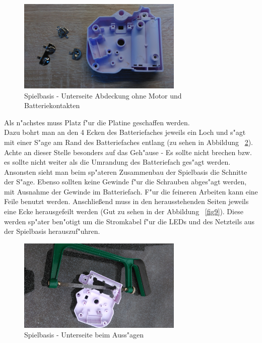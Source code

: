 \vspace{1cm}
\begin{figure}[!ht]
	\centering
  	\includegraphics[width=0.7\textwidth]{pictures/loolou_007.jpg}
	\caption{Spielbasis - Unterseite Abdeckung ohne Motor und Batteriekontakten}
	\label{fig7}
\end{figure}
\vspace{0.5cm}

Als n"achstes muss Platz f"ur die Platine geschaffen werden. \\ 
Dazu bohrt man an den 4 Ecken des Batteriefaches jeweils ein Loch und s"agt mit einer S"age am Rand des Batteriefaches entlang (zu sehen in Abbildung ~\ref{fig8}). \\
Achte an dieser Stelle besonders auf das Geh"ause - Es sollte nicht brechen bzw. es sollte nicht weiter als die Umrandung des Batteriefach ges"agt werden. Ansonsten sieht man beim sp"ateren Zusammenbau der Spielbasis die Schnitte der S"age. Ebenso sollten keine Gewinde f"ur die Schrauben abges"agt werden, mit Ausnahme der Gewinde im Batteriefach. 
F"ur die feineren Arbeiten kann eine Feile benutzt werden. 
Anschließend muss in den herausstehenden Seiten jeweils eine Ecke herausgefeilt werden (Gut zu sehen in der Abbildung ~\ref{fig9}). Diese werden sp"ater ben"otigt um die Stromkabel f"ur die LEDs und des Netzteils aus der Spielbasis herauszuf"uhren.  

\vspace{1cm}
\begin{figure}[!ht]
	\centering
  	\includegraphics[width=0.7\textwidth]{pictures/loolou_008.jpg}
	\caption{Spielbasis - Unterseite beim Auss"agen}
	\label{fig8}
\end{figure}
\vspace{0.5cm}

